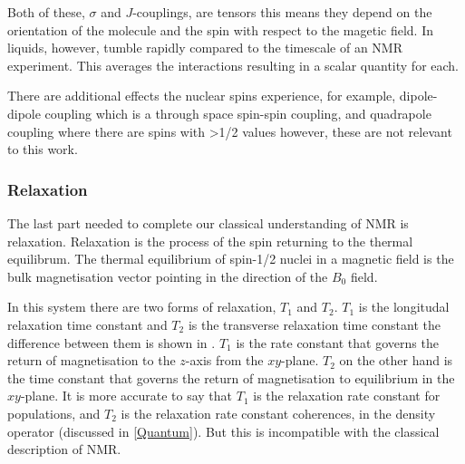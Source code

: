 Both of these, $\sigma$ and $J$-couplings, are tensors this means they depend on the orientation of the molecule
and the spin with respect to the magetic field. In liquids, however, tumble rapidly compared to the timescale
of an NMR experiment. This averages the interactions resulting in a scalar quantity for each.

There are additional effects the nuclear spins experience, for example, dipole-dipole coupling which
is a through space spin-spin coupling, and quadrapole coupling where there are spins with >1/2 values
however, these are not relevant to this work.

\subsubsection{Relaxation}\label{Relaxation}

The last part needed to complete our classical understanding of NMR is relaxation. Relaxation is the process
of the spin returning to the thermal equilibrum. The thermal equilibrium of spin-1/2 nuclei in a
magnetic field is the bulk magnetisation vector pointing in the direction of the $B_0$ field.

In this system there are two forms of relaxation, $T_1$ and $T_2$. $T_1$ is the longitudal relaxation time
constant and $T_2$ is the transverse relaxation time constant the difference between them is shown in .
$T_1$ is the rate constant that governs the return of magnetisation to the $z$-axis from the $xy$-plane. $T_2$ on
the other hand is the time constant that governs the return of magnetisation to equilibrium in the $xy$-plane.
It is more accurate to say that $T_1$ is the relaxation rate constant for populations, and $T_2$ is the relaxation
rate constant coherences, in the density operator (discussed in \ref{Quantum}). But this is incompatible
with the classical description of NMR.

